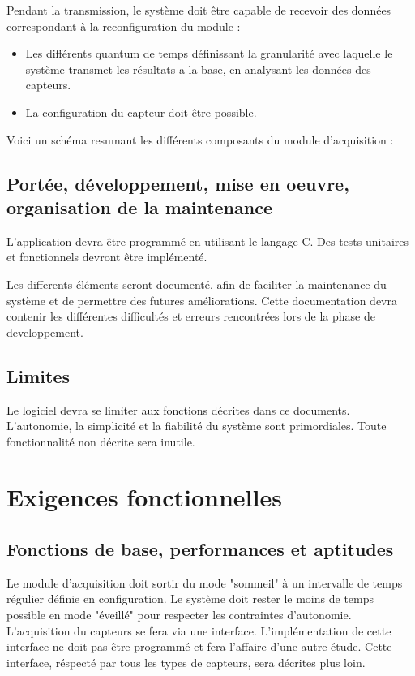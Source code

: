 Pendant la transmission, le système doit être capable de recevoir des données correspondant à la reconfiguration du module :

\begin{itemize}
\item Les différents quantum de temps définissant la granularité avec laquelle le système transmet les résultats a la base, en analysant les données des capteurs.
\item La configuration du capteur doit être possible.
\end{itemize}

Voici un schéma resumant les différents composants du module d'acquisition :

\subsection{Portée, développement, mise en oeuvre, organisation de la maintenance}

L'application devra être programmé en utilisant le langage C. Des tests unitaires et fonctionnels devront être implémenté.

Les differents éléments seront documenté, afin de faciliter la maintenance du système et de permettre des futures améliorations. Cette documentation devra contenir les différentes difficultés et erreurs rencontrées lors de la phase de developpement.

\subsection{Limites}

Le logiciel devra se limiter aux fonctions décrites dans ce documents. L'autonomie, la simplicité et la fiabilité du système sont primordiales. Toute fonctionnalité non décrite sera inutile.

\section{Exigences fonctionnelles}
\subsection{Fonctions de base, performances et aptitudes}

Le module d'acquisition doit sortir du mode "sommeil" à un intervalle de temps régulier définie en configuration. Le système doit rester le moins de temps possible en mode "éveillé" pour respecter les contraintes d'autonomie.
L'acquisition du capteurs se fera via une interface. L'implémentation de cette interface ne doit pas être programmé et fera l'affaire d'une autre étude. Cette interface, réspecté par tous les types de capteurs, sera décrites plus loin.

